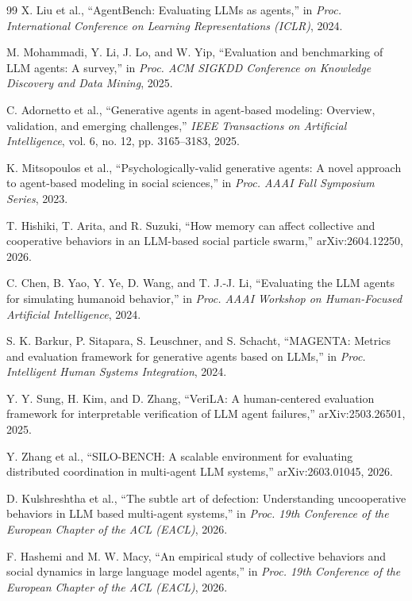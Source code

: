 \documentclass[11pt]{article}
\begin{document}
\begin{thebibliography}{99}
X. Liu et al., ``AgentBench: Evaluating LLMs as agents,'' in \emph{Proc. International Conference on Learning Representations (ICLR)}, 2024.

M. Mohammadi, Y. Li, J. Lo, and W. Yip, ``Evaluation and benchmarking of LLM agents: A survey,'' in \emph{Proc. ACM SIGKDD Conference on Knowledge Discovery and Data Mining}, 2025.

C. Adornetto et al., ``Generative agents in agent-based modeling: Overview, validation, and emerging challenges,'' \emph{IEEE Transactions on Artificial Intelligence}, vol. 6, no. 12, pp. 3165--3183, 2025.

K. Mitsopoulos et al., ``Psychologically-valid generative agents: A novel approach to agent-based modeling in social sciences,'' in \emph{Proc. AAAI Fall Symposium Series}, 2023.

T. Hishiki, T. Arita, and R. Suzuki, ``How memory can affect collective and cooperative behaviors in an LLM-based social particle swarm,'' arXiv:2604.12250, 2026.

C. Chen, B. Yao, Y. Ye, D. Wang, and T. J.-J. Li, ``Evaluating the LLM agents for simulating humanoid behavior,'' in \emph{Proc. AAAI Workshop on Human-Focused Artificial Intelligence}, 2024.

S. K. Barkur, P. Sitapara, S. Leuschner, and S. Schacht, ``MAGENTA: Metrics and evaluation framework for generative agents based on LLMs,'' in \emph{Proc. Intelligent Human Systems Integration}, 2024.

Y. Y. Sung, H. Kim, and D. Zhang, ``VeriLA: A human-centered evaluation framework for interpretable verification of LLM agent failures,'' arXiv:2503.26501, 2025.

Y. Zhang et al., ``SILO-BENCH: A scalable environment for evaluating distributed coordination in multi-agent LLM systems,'' arXiv:2603.01045, 2026.

D. Kulshreshtha et al., ``The subtle art of defection: Understanding uncooperative behaviors in LLM based multi-agent systems,'' in \emph{Proc. 19th Conference of the European Chapter of the ACL (EACL)}, 2026.

F. Hashemi and M. W. Macy, ``An empirical study of collective behaviors and social dynamics in large language model agents,'' in \emph{Proc. 19th Conference of the European Chapter of the ACL (EACL)}, 2026.


\end{thebibliography}
\end{document}
